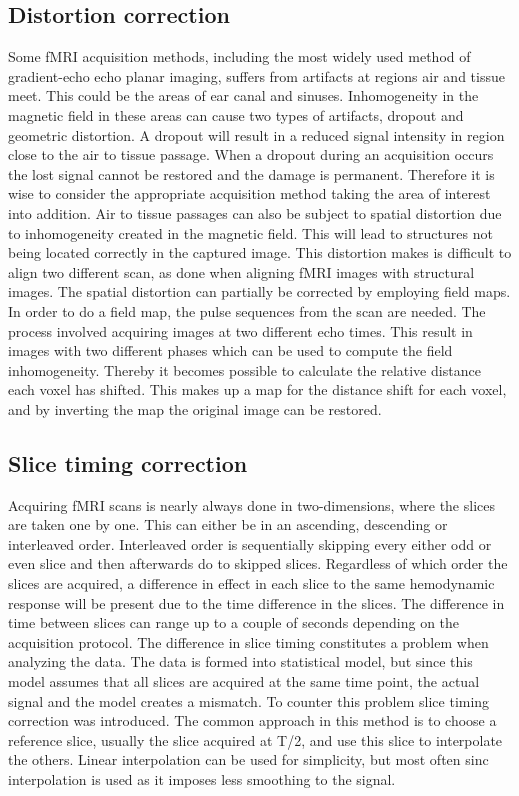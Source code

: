 \subsection{Distortion correction}

Some fMRI acquisition methods, including the most widely used method of gradient-echo echo planar imaging, suffers from artifacts at regions air and tissue meet. This could be the areas of ear canal and sinuses. Inhomogeneity in the magnetic field in these areas can cause two types of artifacts, dropout and geometric distortion. A dropout will result in a reduced signal intensity in region close to the air to tissue passage. When a dropout during an acquisition occurs the lost signal cannot be restored and the damage is permanent. Therefore it is wise to consider the appropriate acquisition method taking the area of interest into addition. Air to tissue passages can also be subject to spatial distortion due to inhomogeneity created in the magnetic field. This will lead to structures not being located correctly in the captured image. This distortion makes is difficult to align two different scan, as done when aligning fMRI images with structural images. 
The spatial distortion can partially be corrected by employing field maps. In order to do a field map, the pulse sequences from the scan are needed. The process involved acquiring images at two different echo times. This result in images with two different phases which can be used to compute the field inhomogeneity. Thereby it becomes possible to calculate the relative distance each voxel has shifted. This makes up a map for the distance shift for each voxel, and by inverting the map the original image can be restored.\cite{Poldrack2011}  

\subsection{Slice timing correction}

Acquiring fMRI scans is nearly always done in two-dimensions, where the slices are taken one by one. This can either be in an ascending, descending or interleaved order. Interleaved order  is sequentially skipping every either odd or even slice and then afterwards do to skipped slices. Regardless of which order the slices are acquired, a difference in effect in each slice to the same hemodynamic response will be present due to the time difference in the slices. The difference in time between slices can range up to a couple of seconds depending on the acquisition protocol. 
The difference in slice timing constitutes a problem when analyzing the data. The data is formed into statistical model, but since this model assumes that all slices are acquired at the same time point, the actual signal and the model creates a mismatch. To counter this problem slice timing correction was introduced. The common approach in this method is to choose a reference slice, usually the slice acquired at T/2, and use this slice to interpolate the others. Linear interpolation can be used for simplicity, but most often sinc interpolation is used as it imposes less smoothing to the signal.\cite{Poldrack2011} 

